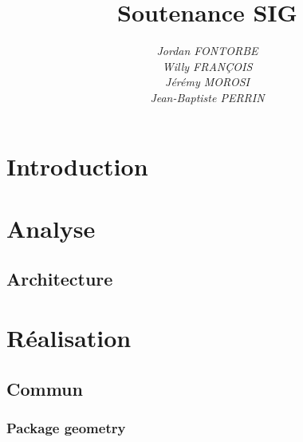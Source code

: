 \documentclass{beamer}
\begin{document}
\title{}
\title{\textbf{Soutenance SIG}}
\author[FONTORBE, FRANÇOIS, MOROSI, PERRIN]{
	\textit{Jordan FONTORBE}\\
	\textit{Willy FRANÇOIS}\\
	\textit{Jérémy MOROSI}\\
	\textit{Jean-Baptiste PERRIN}
}
\maketitle

\tableofcontents

\section{Introduction}
\begin{frame}
\end{frame}


\section{Analyse}
\subsection{Architecture}
\begin{frame}
\end{frame}


\section{Réalisation}

\subsection{Commun}
\subsubsection{Package geometry}
\begin{frame}
\end{frame}
\end{document}
